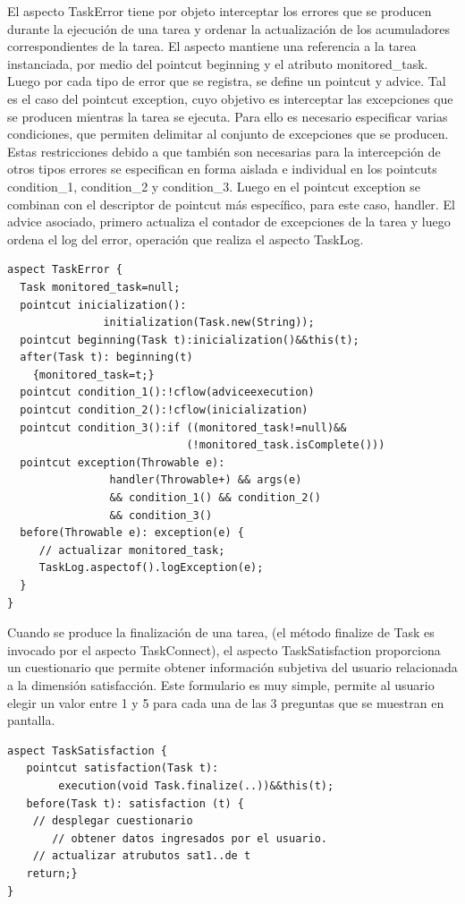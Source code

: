 El aspecto TaskError tiene por objeto interceptar los errores que se producen durante la ejecución de una tarea y ordenar la actualización de los acumuladores correspondientes de la tarea. El aspecto mantiene una referencia a la tarea instanciada, por medio del pointcut beginning y el atributo monitored\_task. Luego por cada tipo de error que se registra, se define un pointcut y advice. Tal es el caso del pointcut exception, cuyo objetivo es interceptar las excepciones que se producen mientras la tarea se ejecuta. Para ello es necesario especificar varias condiciones, que permiten delimitar al conjunto de excepciones que se producen. Estas restricciones debido a que también son necesarias para la intercepción de otros tipos errores se especifican en forma aislada e individual en los pointcuts condition\_1, condition\_2 y condition\_3. Luego en el pointcut exception se combinan con el descriptor de pointcut más específico, para este caso, handler. El advice asociado, primero actualiza el contador de excepciones de la tarea y luego ordena el log del error, operación que realiza el aspecto TaskLog. 
\squeezeup
\begin{verbatim}
aspect TaskError {
  Task monitored_task=null;
  pointcut inicialization():    
               initialization(Task.new(String));
  pointcut beginning(Task t):inicialization()&&this(t);
  after(Task t): beginning(t)
    {monitored_task=t;} 
  pointcut condition_1():!cflow(adviceexecution)
  pointcut condition_2():!cflow(inicialization) 
  pointcut condition_3():if ((monitored_task!=null)&&
                            (!monitored_task.isComplete()))
  pointcut exception(Throwable e): 
                handler(Throwable+) && args(e)
                && condition_1() && condition_2()
                && condition_3()
  before(Throwable e): exception(e) {
     // actualizar monitored_task;
     TaskLog.aspectof().logException(e);
  }
}
\end{verbatim}
\squeezeup

Cuando se produce la finalización de una tarea, (el método finalize de Task es invocado por el aspecto TaskConnect), el aspecto TaskSatisfaction proporciona un cuestionario que permite obtener información subjetiva del usuario relacionada a la dimensión satisfacción. Este formulario es muy simple, permite al usuario elegir un valor entre 1 y 5 para cada una de las 3 preguntas que se muestran en pantalla. 
\squeezeup
\begin{verbatim}
aspect TaskSatisfaction {
   pointcut satisfaction(Task t):
        execution(void Task.finalize(..))&&this(t);	
   before(Task t): satisfaction (t) {
	// desplegar cuestionario 
       // obtener datos ingresados por el usuario.
	// actualizar atrubutos sat1..de t
   return;}
}
\end{verbatim}
\squeezeup

